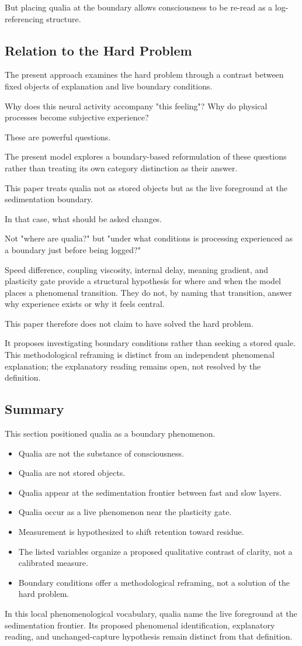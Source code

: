 But placing qualia at the boundary allows consciousness to be re-read as a log-referencing structure.

\subsection{Relation to the Hard Problem}


The present approach examines the hard problem through a contrast between fixed objects of explanation and live boundary conditions.

Why does this neural activity accompany "this feeling"? Why do physical processes become subjective experience?

These are powerful questions.

The present model explores a boundary-based reformulation of these questions rather than treating its own category distinction as their answer.

This paper treats qualia not as stored objects but as the live foreground at the sedimentation boundary.

In that case, what should be asked changes.

Not "where are qualia?" but "under what conditions is processing experienced as a boundary just before being logged?"

Speed difference, coupling viscosity, internal delay, meaning gradient, and plasticity gate provide a structural hypothesis for where and when the model places a phenomenal transition. They do not, by naming that transition, answer why experience exists or why it feels central.

This paper therefore does not claim to have solved the hard problem.

It proposes investigating boundary conditions rather than seeking a stored quale. This methodological reframing is distinct from an independent phenomenal explanation; the explanatory reading remains open, not resolved by the definition.

\subsection{Summary}


This section positioned qualia as a boundary phenomenon.

\begin{itemize}
\item Qualia are not the substance of consciousness.
\item Qualia are not stored objects.
\item Qualia appear at the sedimentation frontier between fast and slow layers.
\item Qualia occur as a live phenomenon near the plasticity gate.
\item Measurement is hypothesized to shift retention toward residue.
\item The listed variables organize a proposed qualitative contrast of clarity, not a calibrated measure.
\item Boundary conditions offer a methodological reframing, not a solution of the hard problem.
\end{itemize}

In this local phenomenological vocabulary, qualia name the live foreground at the sedimentation frontier. Its proposed phenomenal identification, explanatory reading, and unchanged-capture hypothesis remain distinct from that definition.
